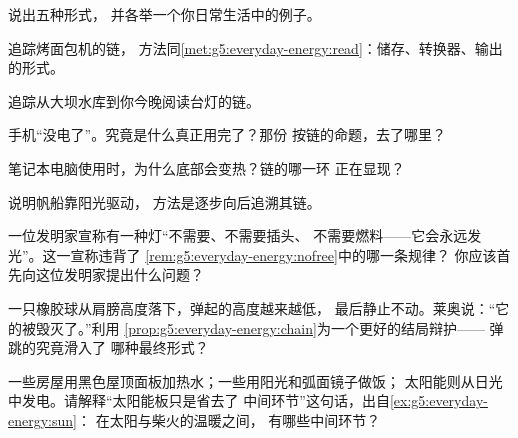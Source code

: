 \begin{exercise}[$\star$]\label{exo:g5:everyday-energy:3}
说出五种形式，
并各举一个你日常生活中的例子。
\end{exercise}

\begin{exercise}[$\star$]\label{exo:g5:everyday-energy:4}
追踪烤面包机的链，
方法同\cref{met:g5:everyday-energy:read}：储存、转换器、输出的形式。
\end{exercise}

\begin{exercise}[$\star$]\label{exo:g5:everyday-energy:5}
追踪从大坝水库到你今晚阅读台灯的链。
\end{exercise}

\begin{exercise}[$\star$]\label{exo:g5:everyday-energy:6}
手机“没电了”。究竟是什么真正用完了？那份
按链的命题，去了哪里？
\end{exercise}

\begin{exercise}[$\star$]\label{exo:g5:everyday-energy:7}
笔记本电脑使用时，为什么底部会变热？链的哪一环
正在显现？
\end{exercise}

\begin{exercise}[$\star$]\label{exo:g5:everyday-energy:8}
说明帆船靠阳光驱动，
方法是逐步向后追溯其链。
\end{exercise}

\begin{exercise}[$\star\star$]\label{exo:g5:everyday-energy:9}
一位发明家宣称有一种灯“不需要、不需要插头、
不需要燃料——它会永远发光”。这一宣称违背了
\cref{rem:g5:everyday-energy:nofree}中的哪一条规律？
你应该首先向这位发明家提出什么问题？
\end{exercise}

\begin{exercise}[$\star\star$]\label{exo:g5:everyday-energy:10}
一只橡胶球从肩膀高度落下，弹起的高度越来越低，
最后静止不动。莱奥说：“它的被毁灭了。”利用
\cref{prop:g5:everyday-energy:chain}为一个更好的结局辩护——
弹跳的究竟滑入了
哪种最终形式？
\end{exercise}

\begin{exercise}[$\star\star$]\label{exo:g5:everyday-energy:11}
一些房屋用黑色屋顶面板加热水；一些用阳光和弧面镜子做饭；
太阳能则从日光中发电。请解释“太阳能板只是省去了
中间环节”这句话，出自\cref{ex:g5:everyday-energy:sun}：
在太阳与柴火的温暖之间，
有哪些中间环节？
\end{exercise}
